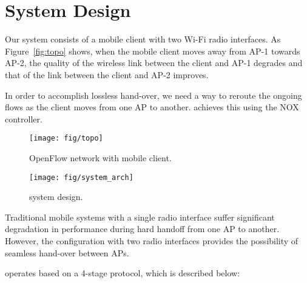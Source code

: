 \section{System Design}
\label{sec:design}

Our system consists of a mobile client with two Wi-Fi radio interfaces. 
As Figure~\ref{fig:topo} shows, when the mobile client moves away from AP-1 towards AP-2, 
the quality of the wireless link between the client and AP-1 degrades and 
that of the link between the client and AP-2 improves.

In order to accomplish lossless hand-over, we need a way to reroute the ongoing flows
as the client moves from one AP to another. \sys{} achieves this using the
NOX controller.

\begin{figure*}[htb!]
\begin{minipage}[t]{0.45\textwidth}
\centerline{\texttt{[image: fig/topo]}}
\caption{OpenFlow network with mobile client.}
\label{fig:topo}
\end{minipage}
\hfill
\begin{minipage}[t]{0.45\textwidth}
\centerline{\texttt{[image: fig/system\_arch]}}
\caption{\sys{} system design.}
\label{fig:sys}
\end{minipage}
\hfill
\end{figure*}

Traditional mobile systems with a single radio interface suffer significant 
degradation in performance during hard handoff from one AP to another. 
However, the configuration with two radio interfaces provides the 
possibility of seamless hand-over between APs.

\sys{} operates based on a 4-stage protocol, which is described below:

